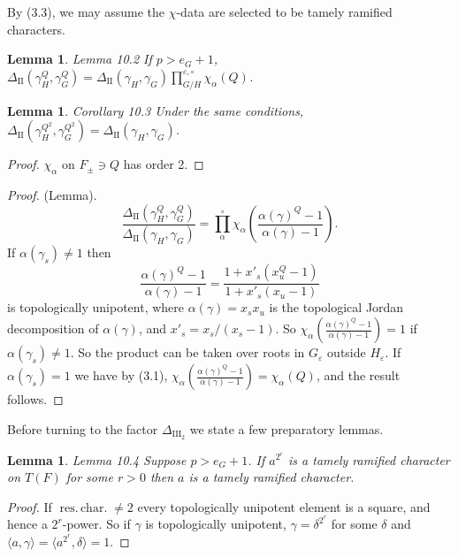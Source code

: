 \documentclass[11pt]{amsart}
\theoremstyle{plain}
\newtheorem{lemma}[theorem]{Lemma}
\theoremstyle{definition}
\def\varep{\varepsilon}
\def\reschar{\operatorname{res.\,char.}}
\def\hgam{\gamma_H}
\def\ggam{\gamma_G}
\begin{document}
By (3.3), we may assume the $\chi$-data are selected to
be tamely ramified characters.

\begin{lemma}{Lemma 10.2}  If $p>e_G+1$,
$\Delta_{\text{II}}(\hgam^Q,\ggam^Q)=
\Delta_{\text{II}}(\hgam,\ggam)
\prod_{G/H}^{\varep,\circ}\chi_\alpha(Q)
$.
\end{lemma}

\begin{lemma}{Corollary 10.3}  Under the same conditions,
$
\Delta_{\text{II}}(\hgam^{Q^2},\ggam^{Q^2})
=\Delta_{\text{II}}(\hgam,\ggam)
$.
\end{lemma}

\begin{proof} $\chi_\alpha$ on $F_\pm\owns Q$
has order 2.
\end{proof}

\begin{proof}(Lemma).
$$
\frac{\Delta_{\text{II}}(\hgam^Q,\ggam^Q)}
     {\Delta_{\text{II}}(\hgam,\ggam)}
=\prod_\alpha^\circ\chi_\alpha\left(
\frac{\alpha(\gamma)^Q-1}
   {\alpha(\gamma)-1}
\right).
$$
If $\alpha(\gamma_s)\ne1$ then
$$
\frac{\alpha(\gamma)^Q-1}{\alpha(\gamma)-1}
=
\frac{1+x'_s(x_u^Q-1)}
     {1+x'_s(x_u-1)}$$
is topologically unipotent, where
$\alpha(\gamma)=x_sx_u$ is the topological Jordan 
decomposition of $\alpha(\gamma)$, and $x'_s = x_s/(x_s-1)$.
So 
$\chi_\alpha\left(\frac{\alpha(\gamma)^Q-1}
{\alpha(\gamma)-1}\right)=1$ if $\alpha(\gamma_s)\ne 1$.
So the product can be taken over roots in 
$G_{\varep}$ outside $H_{\varep}$.
If $\alpha(\gamma_s)=1$ we have by (3.1),
$\chi_\alpha\left(\frac{\alpha(\gamma)^Q-1}
{\alpha(\gamma)-1}\right)=\chi_\alpha(Q)$,
and the result follows.
\end{proof}

Before turning to the factor $\Delta_{\text{III}_2}$
we state a few preparatory lemmas.

\begin{lemma}{Lemma 10.4}  Suppose $p > e_G+1$.   If
$a^{2^r}$ is a tamely ramified character on $T(F)$ for some $r>0$ then $a$
is a tamely ramified character.
\end{lemma}

\begin{proof}  If $\reschar\ne 2$ every topologically unipotent
element is a square, and hence a $2^r$-power.  So if $\gamma$ is 
topologically unipotent, $\gamma=\delta^{2^r}$ for some $\delta$ and
$
\langle a,\gamma\rangle
= \langle a^{2^r},\delta\rangle=1.
$
\end{proof}
\end{document}
